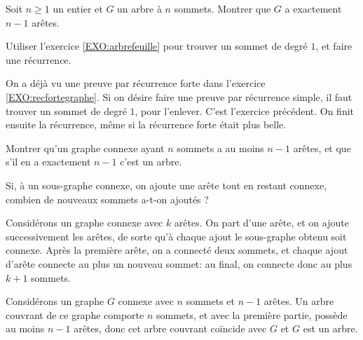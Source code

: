 \begin{exo}
Soit $n\geq  1$ un entier et $G$ un arbre à $n$ sommets. Montrer que $G$ a exactement $n-1$ arêtes.

\begin{hint}
Utiliser l'exercice \ref{EXO:arbrefeuille} pour trouver un sommet de degré $1$, et faire une récurrence.
\end{hint}
\begin{sol}
On a déjà vu une preuve par récurrence forte dans l'exercice \ref{EXO:recfortegraphe}.  Si on désire faire une preuve par récurrence simple, il faut trouver un sommet de degré $1$, pour l'enlever. C'est l'exercice précédent. On finit ensuite la récurrence, même si la récurrence forte était plus belle.
\end{sol}
\end{exo}

\begin{exo}
Montrer qu'un graphe connexe ayant $n$ sommets a au moins $n-1$ arêtes, et que s'il en a exactement $n-1$ c'est un arbre.

\begin{hint}
Si, à un sous-graphe connexe, on ajoute une arête tout en restant connexe, combien de nouveaux sommets a-t-on ajoutés ?
\end{hint}

\begin{sol}
Considérons un graphe connexe avec $k$ arêtes. On part d'une arête, et on ajoute successivement les arêtes, de sorte qu'à chaque ajout le sous-graphe obtenu soit connexe. Après la première arête, on a connecté deux sommets, et chaque ajout d'arête connecte au plus un nouveau sommet: au final, on connecte donc au plus $k+1$ sommets.

Considérons un graphe $G$ connexe avec $n$ sommets et $n-1$ arêtes. Un arbre couvrant de ce graphe comporte $n$ sommets, et avec la première partie, possède au moins $n-1$ arêtes, donc cet arbre couvrant coïncide avec $G$ et $G$ est un arbre.
\end{sol}
\end{exo}

